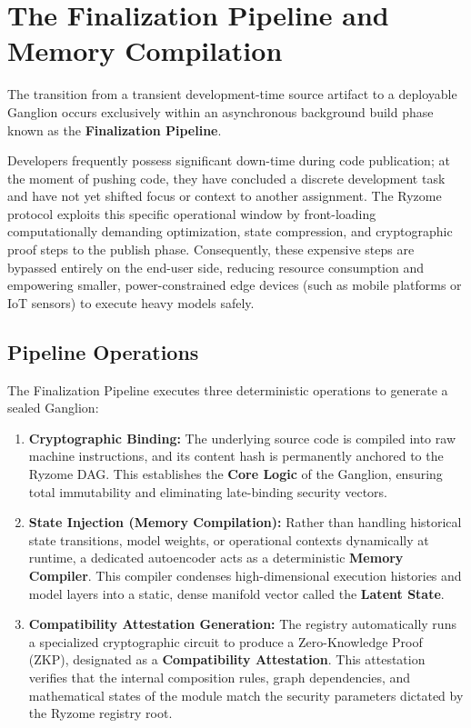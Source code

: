 \documentclass{article}
\begin{document}
\section{The Finalization Pipeline and Memory Compilation}
The transition from a transient development-time source artifact to a deployable Ganglion occurs exclusively within an asynchronous background build phase known as the \textbf{Finalization Pipeline}. 

Developers frequently possess significant down-time during code publication; at the moment of pushing code, they have concluded a discrete development task and have not yet shifted focus or context to another assignment. The Ryzome protocol exploits this specific operational window by front-loading computationally demanding optimization, state compression, and cryptographic proof steps to the publish phase. Consequently, these expensive steps are bypassed entirely on the end-user side, reducing resource consumption and empowering smaller, power-constrained edge devices (such as mobile platforms or IoT sensors) to execute heavy models safely.

\subsection{Pipeline Operations}
The Finalization Pipeline executes three deterministic operations to generate a sealed Ganglion:
\begin{enumerate}
    \item \textbf{Cryptographic Binding:} The underlying source code is compiled into raw machine instructions, and its content hash is permanently anchored to the Ryzome DAG. This establishes the \textbf{Core Logic} of the Ganglion, ensuring total immutability and eliminating late-binding security vectors.
    \item \textbf{State Injection (Memory Compilation):} Rather than handling historical state transitions, model weights, or operational contexts dynamically at runtime, a dedicated autoencoder acts as a deterministic \textbf{Memory Compiler}. This compiler condenses high-dimensional execution histories and model layers into a static, dense manifold vector called the \textbf{Latent State}.
    \item \textbf{Compatibility Attestation Generation:} The registry automatically runs a specialized cryptographic circuit to produce a Zero-Knowledge Proof (ZKP), designated as a \textbf{Compatibility Attestation}. This attestation verifies that the internal composition rules, graph dependencies, and mathematical states of the module match the security parameters dictated by the Ryzome registry root.
\end{enumerate}
\end{document}
